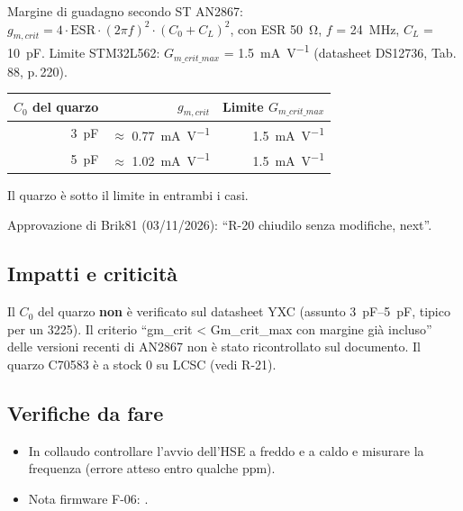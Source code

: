 Margine di guadagno secondo ST AN2867: $g_{m,crit} = 4\cdot \mathrm{ESR}\cdot(2\pi f)^2\cdot(C_0+C_L)^2$, con ESR \SI{50}{\ohm}, $f$ = \SI{24}{\mega\hertz}, $C_L$ = \SI{10}{\pico\farad}. Limite STM32L562: $G_{m\_crit\_max}$ = \SI{1,5}{\milli\ampere\per\volt} (datasheet DS12736, Tab.\,88, p.\,220).

{\small{}
\begin{tabular}{@{}rrr@{}}
\toprule
\textbf{$C_0$ del quarzo} & \textbf{$g_{m,crit}$} & \textbf{Limite $G_{m\_crit\_max}$}\\
\midrule
\SI{3}{\pico\farad} & $\approx$ \SI{0,77}{\milli\ampere\per\volt} & \SI{1,5}{\milli\ampere\per\volt}\\
\SI{5}{\pico\farad} & $\approx$ \SI{1,02}{\milli\ampere\per\volt} & \SI{1,5}{\milli\ampere\per\volt}\\
\bottomrule
\end{tabular}}

Il quarzo è sotto il limite in entrambi i casi.

Approvazione di Brik81 (03/11/2026): \textquotedblleft{}R-20 chiudilo senza modifiche, next\textquotedblright{}.

\subsection{Impatti e criticità}
\begin{notebox}
Il $C_0$ del quarzo \textbf{non} è verificato sul datasheet YXC (assunto \SIrange{3}{5}{\pico\farad}, tipico per un 3225). Il criterio \textquotedblleft{}gm\_crit < Gm\_crit\_max con margine già incluso\textquotedblright{} delle versioni recenti di AN2867 non è stato ricontrollato sul documento. Il quarzo C70583 è a stock 0 su LCSC (vedi R-21).
\end{notebox}

\subsection{Verifiche da fare}
\begin{itemize}
\item In collaudo controllare l'avvio dell'HSE a freddo e a caldo e misurare la frequenza (errore atteso entro qualche ppm).
\item Nota firmware F-06: .
\end{itemize}
